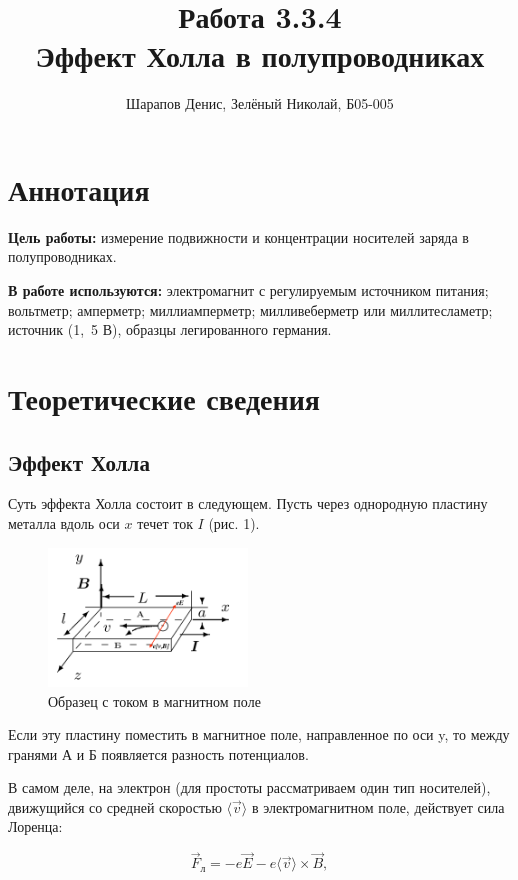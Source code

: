 \documentclass[a4paper]{article}
\title{Работа 3.3.4 \\ Эффект Холла в полупроводниках}
\author{Шарапов Денис, Зелёный Николай, Б05-005}
\date{}
\theoremstyle{definition}
\theoremstyle{remark}
\begin{document}
    \maketitle
    \tableofcontents
    \newpage
    
\section{Аннотация}

\textbf{Цель работы:} измерение подвижности и концентрации носителей заряда в полупроводниках. \medskip
 
\noindent \textbf{В работе используются:} электромагнит с регулируемым источником питания; вольтметр; амперметр; миллиамперметр; милливеберметр или миллитесламетр; источник (1,~5 В), образцы легированного германия.

\section{Теоретические сведения}

\subsection{Эффект Холла}

Суть эффекта Холла состоит в следующем. Пусть через однородную пластину металла вдоль оси $x$ течет ток $I$ (рис. 1).

\begin{figure}[h!]
    \centering
    \includegraphics[width = 150pt]{image/Holl1.png}
    \caption{Образец с током в магнитном поле}
\end{figure}

	
	Если эту пластину поместить в магнитное поле, направленное по оси y, то между гранями А и Б появляется разность потенциалов. \medskip
	
	В самом деле, на электрон (для простоты рассматриваем один тип носителей), движущийся со средней скоростью $\langle \vec{v} \rangle$ в электромагнитном поле, действует сила Лоренца:
	
	$$\vec{F}_{\text{л}} = -e\vec{E}-e \langle \vec{v} \rangle \times \vec{B},$$
	
\end{document}
